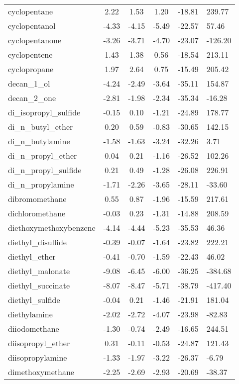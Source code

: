 \documentclass{amsart}
\begin{document}
\begin{longtable}{L|C|C|C|X|X}
cyclopentane & 2.22 & 1.53 & 1.20 & -18.81 & 239.77 \\ 
cyclopentanol & -4.33 & -4.15 & -5.49 & -22.57 & 57.46 \\ 
cyclopentanone & -3.26 & -3.71 & -4.70 & -23.07 & -126.20 \\ 
cyclopentene & 1.43 & 1.38 & 0.56 & -18.54 & 213.11 \\ 
cyclopropane & 1.97 & 2.64 & 0.75 & -15.49 & 205.42 \\ 
decan\_1\_ol & -4.24 & -2.49 & -3.64 & -35.11 & 154.87 \\ 
decan\_2\_one & -2.81 & -1.98 & -2.34 & -35.34 & -16.28 \\ 
di\_isopropyl\_sulfide & -0.15 & 0.10 & -1.21 & -24.89 & 178.77 \\ 
di\_n\_butyl\_ether & 0.20 & 0.59 & -0.83 & -30.65 & 142.15 \\ 
di\_n\_butylamine & -1.58 & -1.63 & -3.24 & -32.26 & 3.71 \\ 
di\_n\_propyl\_ether & 0.04 & 0.21 & -1.16 & -26.52 & 102.26 \\ 
di\_n\_propyl\_sulfide & 0.21 & 0.49 & -1.28 & -26.08 & 226.91 \\ 
di\_n\_propylamine & -1.71 & -2.26 & -3.65 & -28.11 & -33.60 \\ 
dibromomethane & 0.55 & 0.87 & -1.96 & -15.59 & 217.61 \\ 
dichloromethane & -0.03 & 0.23 & -1.31 & -14.88 & 208.59 \\ 
diethoxymethoxybenzene & -4.14 & -4.44 & -5.23 & -35.53 & 46.36 \\ 
diethyl\_disulfide & -0.39 & -0.07 & -1.64 & -23.82 & 222.21 \\ 
diethyl\_ether & -0.41 & -0.70 & -1.59 & -22.43 & 46.02 \\ 
diethyl\_malonate & -9.08 & -6.45 & -6.00 & -36.25 & -384.68 \\ 
diethyl\_succinate & -8.07 & -8.47 & -5.71 & -38.79 & -417.40 \\ 
diethyl\_sulfide & -0.04 & 0.21 & -1.46 & -21.91 & 181.04 \\ 
diethylamine & -2.02 & -2.72 & -4.07 & -23.98 & -82.83 \\ 
diiodomethane & -1.30 & -0.74 & -2.49 & -16.65 & 244.51 \\ 
diisopropyl\_ether & 0.31 & -0.11 & -0.53 & -24.87 & 121.43 \\ 
diisopropylamine & -1.33 & -1.97 & -3.22 & -26.37 & -6.79 \\ 
dimethoxymethane & -2.25 & -2.69 & -2.93 & -20.69 & -38.37 \\ 

\end{longtable}
\end{document}
